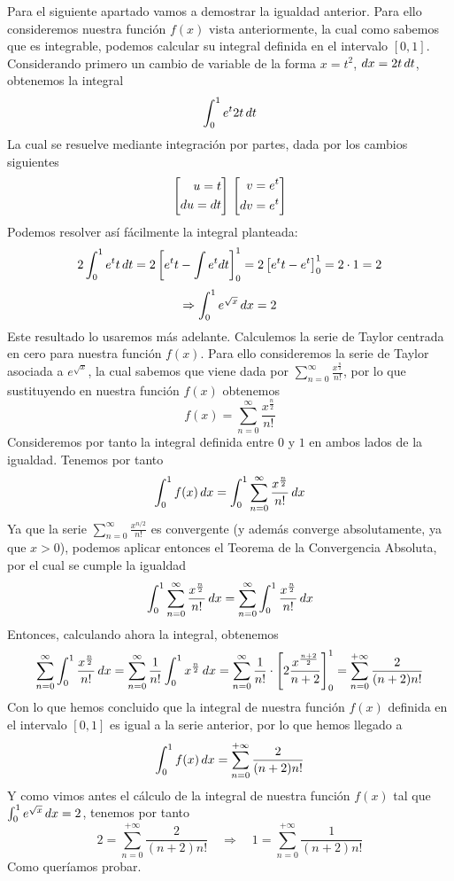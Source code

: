 \documentclass[fleqn]{article}
\def\next{\quad \Rightarrow \quad}
\begin{document}
    Para el siguiente apartado vamos a demostrar la igualdad anterior. Para ello consideremos nuestra función $f(x)$ vista anteriormente, la cual como sabemos que 
    es integrable, podemos calcular su integral definida en el intervalo $[0,1]$. Considerando primero un cambio de variable de la forma $x=t^2$, $dx = 2t \thinspace dt$,
    obtenemos la integral
    $$\int_0^1 e^t 2t \thinspace dt$$
    La cual se resuelve mediante integración por partes, dada por los cambios siguientes
    \begin{equation*}
        \left[
        \begin{aligned}
            u = t \\
            du = dt
        \end{aligned}
        \right]\\
        \left[
        \begin{aligned}
            v = e^t \\
            dv = e^t
        \end{aligned}
        \right]
    \end{equation*}
    Podemos resolver así fácilmente la integral planteada:
    $$2 \int_0^1 e^t t \thinspace dt = 2 \left[e^t t - \int e^t dt \right]_0^1 = 2 \left[e^t t - e^t \right]_0^1 = 2 \cdot 1 = 2 $$
    $$\Rightarrow \int_0^1 e^{\sqrt{x}} \thinspace dx = 2$$
    Este resultado lo usaremos más adelante. Calculemos la serie de Taylor centrada en cero para nuestra función $f(x)$. Para ello consideremos la serie de Taylor 
    asociada a $e^{\sqrt{x}}$, la cual sabemos que viene dada por $\sum_{n=0}^{\infty} \frac{x^{\frac{n}{2}}}{n!}$, por lo que sustituyendo en nuestra función $f(x)$ obtenemos
    $$f(x) = \sum_{n=0}^{\infty} \frac{x^{\frac{n}{2}}}{n!}$$
    Consideremos por tanto la integral definida entre $0$ y $1$ en ambos lados de la igualdad. Tenemos por tanto
    $$\int_0^1f(x) \thinspace dx = \int_0^1 \sum_{n=0}^{\infty} \frac{x^{\frac{n}{2}}}{n!} \thinspace dx$$
    Ya que la serie $\sum_{n=0}^{\infty} \frac{x^{n/2}}{n!}$ es convergente (y además converge absolutamente, ya que $x>0$), podemos aplicar entonces 
    el Teorema de la Convergencia Absoluta, por el cual se cumple la igualdad
    $$\int_0^1 \sum_{n=0}^{\infty} \frac{x^{\frac{n}{2}}}{n!} \thinspace dx = \sum_{n=0}^{\infty} \int_0^1 \frac{x^{\frac{n}{2}}}{n!} \thinspace dx$$
    Entonces, calculando ahora la integral, obtenemos
    $$\sum_{n=0}^{\infty} \int_0^1 \frac{x^{\frac{n}{2}}}{n!} \thinspace dx = \sum_{n=0}^{\infty} \frac{1}{n!} \int_0^1 x^{\frac{n}{2}} \thinspace dx = 
    \sum_{n=0}^{\infty} \frac{1}{n!} \cdot \left[2 \frac{x^{\frac{n+2}{2}}}{n+2} \right]_0^1 = \sum_{n=0}^{+\infty} \frac{2}{(n+2)n!} $$
    Con lo que hemos concluido que la integral de nuestra función $f(x)$ definida en el intervalo $[0,1]$ es igual a la serie anterior, por lo que hemos llegado a 
    $$\int_0^1 f(x) \thinspace dx = \sum_{n=0}^{+\infty} \frac{2}{(n+2)n!} $$
    Y como vimos antes el cálculo de la integral de nuestra función $f(x)$ tal que $\int_0^1 e^{\sqrt{x}} \thinspace dx = 2$, tenemos por tanto
    $$2 = \sum_{n=0}^{+\infty} \frac{2}{(n+2)n!} \next 1 = \sum_{n=0}^{+\infty} \frac{1}{(n+2)n!}$$
    Como queríamos probar.
   
\end{document}
